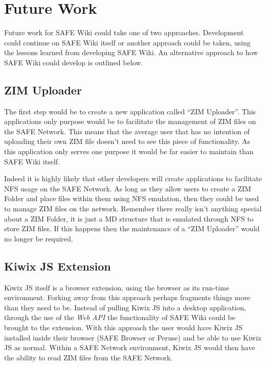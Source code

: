 \section{Future Work}

Future work for SAFE Wiki could take one of two approaches. Development could continue on SAFE Wiki itself or another approach could be taken, using the lessons learned from developing SAFE Wiki. An alternative approach to how SAFE Wiki could develop is outlined below.

\subsection{ZIM Uploader}

The first step would be to create a new application called ``ZIM Uploader''. This applications only purpose would be to facilitate the management of ZIM files on the SAFE Network. This means that the average user that has no intention of uploading their own ZIM file doesn't need to see this piece of functionality. As this application only serves one purpose it would be far easier to maintain than SAFE Wiki itself.

Indeed it is highly likely that other developers will create applications to facilitate NFS usage on the SAFE Network. As long as they allow users to create a ZIM Folder and place files within them using NFS emulation, then they could be used to manage ZIM files on the network. Remember there really isn't anything special about a ZIM Folder, it is just a MD structure that is emulated through NFS to store ZIM files. If this happens then the maintenance of a ``ZIM Uploader'' would no longer be required.

\subsection{Kiwix JS Extension}
\label{subsec:kiwix-js-safe}

Kiwix JS itself is a browser extension, using the browser as its run-time environment. Forking away from this approach perhaps fragments things more than they need to be. Instead of pulling Kiwix JS into a desktop application, through the use of the \textit{Web API} the functionality of SAFE Wiki could be brought to the extension. With this approach the user would have Kiwix JS installed inside their browser (SAFE Browser or Peruse) and be able to use Kiwix JS as normal. Within a SAFE Network environment, Kiwix JS would then have the ability to read ZIM files from the SAFE Network.

